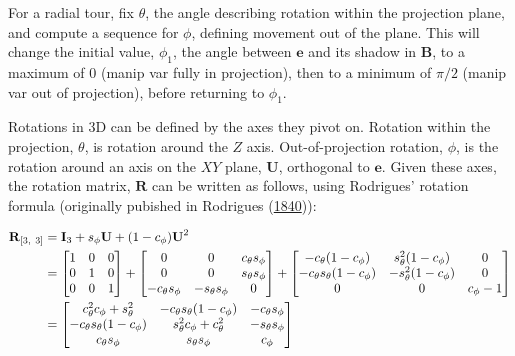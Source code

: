 For a radial tour, fix \(\theta\), the angle describing rotation within
the projection plane, and compute a sequence for \(\phi\), defining
movement out of the plane. This will change the initial value,
\(\phi_1\), the angle between \(\textbf{e}\) and its shadow in
\(\textbf{B}\), to a maximum of \(0\) (manip var fully in projection),
then to a minimum of \(\pi/2\) (manip var out of projection), before
returning to \(\phi_1\).

Rotations in 3D can be defined by the axes they pivot on. Rotation
within the projection, \(\theta\), is rotation around the \(Z\) axis.
Out-of-projection rotation, \(\phi\), is the rotation around an axis on
the \(XY\) plane, \(\textbf{U}\), orthogonal to \(\textbf{e}\). Given
these axes, the rotation matrix, \(\textbf{R}\) can be written as
follows, using Rodrigues' rotation formula (originally pubished in
Rodrigues (\protect\hyperlink{ref-rodrigues_lois_1840}{1840})):

\begin{align*}
    \textbf{R}_{[3,~3]} 
    &= \textbf{I}_3 + s_\phi\*\textbf{U} + (1-c_\phi)\*\textbf{U}^2 \\
        &=
    \begin{bmatrix}
      1&0&0 \\ 
      0&1&0 \\ 
      0&0&1 \\
    \end{bmatrix} +
    \begin{bmatrix}
      0 & 0 & c_\theta s_\phi \\
      0 & 0 & s_\theta s_\phi \\
      -c_\theta s_\phi & -s_\theta s_\phi & 0 \\
    \end{bmatrix} +
    \begin{bmatrix}
      -c_\theta (1-c_\phi) & s^2_\theta (1-c_\phi) & 0 \\
      -c_\theta s_\theta (1-c_\phi) & -s^2_\theta (1-c_\phi) & 0 \\
      0 & 0 & c_\phi-1 \\
    \end{bmatrix} \\
    &= 
    \begin{bmatrix}
      c_\theta^2 c_\phi + s_\theta^2 &
      -c_\theta s_\theta (1 - c_\phi) &
      -c_\theta s_\phi \\
      -c_\theta s_\theta (1 - c_\phi) &
      s_\theta^2 c_\phi + c_\theta^2 &
      -s_\theta s_\phi \\
      c_\theta s_\phi &
      s_\theta s_\phi &
      c_\phi
    \end{bmatrix} \\
\end{align*}

